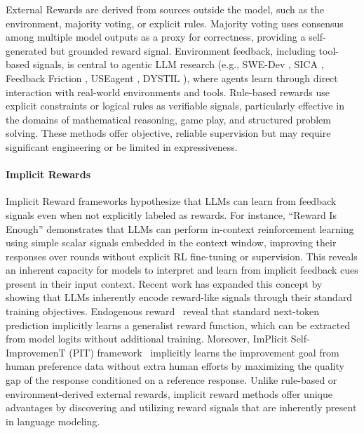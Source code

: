 External Rewards are derived from sources outside the model, such as the environment, majority voting, or explicit rules. Majority voting \citep{shafayat2025largereasoningmodelsselftrain, wei2025unsupervisedposttrainingmultimodalllm, zhang2025consistentpathsleadtruth} uses consensus among multiple model outputs as a proxy for correctness, providing a self-generated but grounded reward signal. Environment feedback, including tool-based signals, is central to agentic LLM research (e.g., SWE-Dev \citep{du2025swedevevaluatingtrainingautonomous}, SICA \citep{robeyns2025self}, Feedback Friction \citep{jiang2025feedbackfriction}, USEagent \citep{applis2025useagent}, DYSTIL \citep{wang2025dystildynamicstrategyinduction}), where agents learn through direct interaction with real-world environments and tools. Rule-based rewards \citep{wang2025otcpo, wang2025autorule, zhang2025learning, simonds2025ladder, wang2025ragen, liu2025spiral} use explicit constraints or logical rules as verifiable signals, particularly effective in the domains of mathematical reasoning, game play, and structured problem solving. These methods offer objective, reliable supervision but may require significant engineering or be limited in expressiveness.

\paragraph{Implicit Rewards}


Implicit Reward frameworks hypothesize that LLMs can learn from feedback signals even when not explicitly labeled as rewards. For instance, “Reward Is Enough” \citep{song2025reward} demonstrates that LLMs can perform in-context reinforcement learning using simple scalar signals embedded in the context window, improving their responses over rounds without explicit RL fine-tuning or supervision. This reveals an inherent capacity for models to interpret and learn from implicit feedback cues present in their input context. Recent work has expanded this concept by showing that LLMs inherently encode reward-like signals through their standard training objectives. 
Endogenous reward~\citep{li2025generalist} reveal that standard next-token prediction implicitly learns a generalist reward function, which can be extracted from model logits without additional training. Moreover, ImPlicit Self-ImprovemenT (PIT) framework~\citep{wang2024enabling} implicitly learns the improvement goal
from human preference data without extra human efforts by maximizing the quality
gap of the response conditioned on a reference response. Unlike rule-based or environment-derived external rewards, implicit reward methods offer unique advantages by discovering and utilizing reward signals that are inherently present in language modeling.


